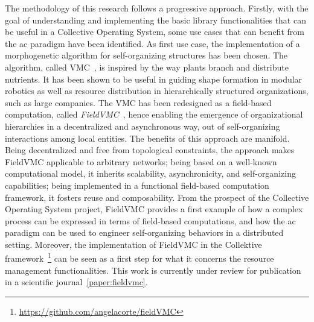 \documentclass[runningheads]{llncs}
\begin{document}
    The methodology of this research follows a progressive approach.
    Firstly,
    with the goal of understanding and implementing the basic library functionalities that can be useful in a Collective Operating System,
    some use cases that can benefit from the \ac{ac} paradigm have been identified.
    As first use case,
    the implementation of a morphogenetic algorithm for self-organizing structures has been chosen.
    The algorithm, called \ac{VMC}~\cite{DBLP:conf/gecco/ZahadatHS17},
    is inspired by the way plants branch and distribute nutrients.
    It has been shown to be useful in guiding shape formation in modular robotics
    as well as resource distribution in hierarchically structured organizations, such as large companies.
    The \ac{VMC} has been redesigned as a field-based computation, called \emph{FieldVMC}~\cite{DBLP:conf/acsos/CortecchiaPCC24},
    hence enabling the emergence of organizational hierarchies in a decentralized and asynchronous way,
    out of self-organizing interactions among local entities.
    The benefits of this approach are manifold.
    Being decentralized and free from topological constraints,
    the approach makes FieldVMC applicable to arbitrary networks;
    being based on a well-known computational model,
    it inherits scalability, asynchronicity, and self-organizing capabilities;
    being implemented in a functional field-based computation framework,
    it fosters reuse and composability.
    From the prospect of the Collective Operating System project,
    FieldVMC provides a first example of how a complex process can be expressed in terms of field-based computations,
    and how the \ac{ac} paradigm can be used to engineer self-organizing behaviors in a distributed setting.
    Moreover,
    the implementation of FieldVMC in the Collektive framework~\footnote{\url{https://github.com/angelacorte/fieldVMC}}
    can be seen as a first step for what it concerns the resource management functionalities.
    This work is currently under review for publication in a scientific journal~\ref{paper:fieldvmc}.
\end{document}
